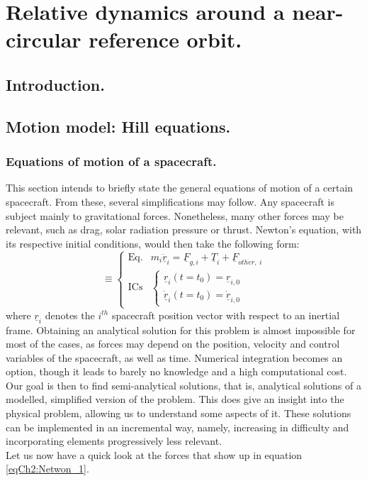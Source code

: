 \chapter{Relative dynamics around a near-circular reference orbit.}
%
\label{chap: HCW}
%
\section{Introduction.}
%
%
\section{Motion model: Hill equations.}
%
\indent
%
	\subsection{Equations of motion of a spacecraft.}
	\indent This section intends to briefly state the general equations of motion of a certain spacecraft. From these, several simplifications may follow. Any spacecraft is subject mainly to gravitational forces. Nonetheless, many other forces may be relevant, such as drag, solar radiation pressure or thrust. Newton's equation, with its respective initial conditions, would then take the following form:
	\begin{equation}
	[P]\equiv\left\{ \begin{array}{lcc}
	\text{Eq.} & m_i \ddot{\underline{r}}_i = \underline{F}_{g, i} + \underline{T}_i + \underline{F}_{other,\; i}\\[1em]
	\text{ICs} & \left\{ \begin{array}{ll}
	\underline{r}_{i} (t = t_0) = \underline{r}_{i, 0} \\
	\dot{\underline{r}}_{i} (t = t_0) = \dot{\underline{r}}_{i, 0} 
	\end{array}\right.
	\end{array}\right.
	\label{eqCh2:Netwon_1}
	\end{equation}
	\noindent where $\underline{r}_i$ denotes the $i^{th}$ spacecraft position vector with respect to an inertial frame. Obtaining an analytical solution for this problem is almost impossible for most of the cases, as forces may depend on the position, velocity and control variables of the spacecraft, as well as time. Numerical integration becomes an option, though it leads to barely no knowledge and a high computational cost. Our goal is then to find semi-analytical solutions, that is, analytical solutions of a modelled, simplified version of the problem. This does give an insight into the physical problem, allowing us to understand some aspects of it. These solutions can be implemented in an incremental way, namely, increasing in difficulty and incorporating elements progressively less relevant. \\
	\indent Let us now have a quick look at the forces that show up in equation \eqref{eqCh2:Netwon_1}.
